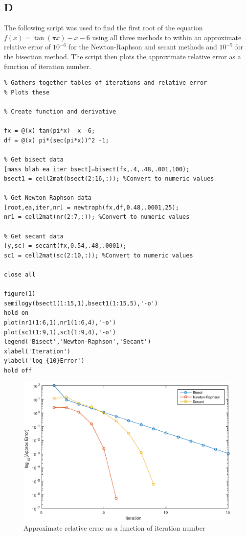 \documentclass{article}
\begin{document}
\subsection*{D}

The following script was used to find the first root of the equation $ f(x) = \tan(\pi x) -x -6 $ using all three methods to within an approximate relative error of $ 10^{-6} $ for the Newton-Raphson and secant methods and $ 10^{-5} $ for the bisection method.  The script then plots the approximate relative error as a function of iteration number.

\begin{lstlisting}
% Gathers together tables of iterations and relative error
% Plots these

% Create function and derivative

fx = @(x) tan(pi*x) -x -6;
df = @(x) pi*(sec(pi*x))^2 -1;

% Get bisect data
[mass blah ea iter bsect]=bisect(fx,.4,.48,.001,100);
bsect1 = cell2mat(bsect(2:16,:)); %Convert to numeric values

% Get Newton-Raphson data
[root,ea,iter,nr] = newtraph(fx,df,0.48,.0001,25);
nr1 = cell2mat(nr(2:7,:)); %Convert to numeric values

% Get secant data
[y,sc] = secant(fx,0.54,.48,.0001);
sc1 = cell2mat(sc(2:10,:)); %Convert to numeric values

close all

figure(1)
semilogy(bsect1(1:15,1),bsect1(1:15,5),'-o')
hold on
plot(nr1(1:6,1),nr1(1:6,4),'-o')
plot(sc1(1:9,1),sc1(1:9,4),'-o')
legend('Bisect','Newton-Raphson','Secant')
xlabel('Iteration')
ylabel('log_{10}Error')
hold off

\end{lstlisting}


\begin{figure}[H]
\centering
\includegraphics[width=5in]{Problem2.eps}
\caption{Approximate relative error as a function of iteration number}
\end{figure}
\end{document}
